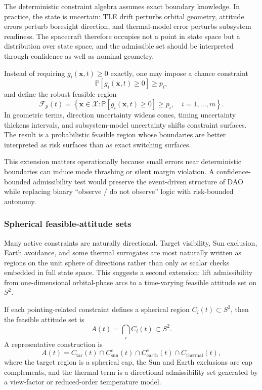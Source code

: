 \documentclass[preprint,12pt]{elsarticle}
\theoremstyle{definition}
\theoremstyle{remark}
\begin{document}
The deterministic constraint algebra assumes exact boundary knowledge.
In practice, the state is uncertain: TLE drift perturbs orbital geometry, attitude errors perturb boresight direction, and thermal-model error perturbs subsystem readiness.
The spacecraft therefore occupies not a point in state space but a distribution over state space, and the admissible set should be interpreted through confidence as well as nominal geometry.

Instead of requiring $g_i(\mathbf{x},t)\ge 0$ exactly, one may impose a chance constraint
\begin{equation}
\mathbb{P}\!\left[g_i(\mathbf{x},t)\ge 0\right]\ge p_i,
\label{eq:chance_constraint}
\end{equation}
and define the robust feasible region
\begin{equation}
\mathcal{F}_p(t)=
\left\{
\mathbf{x}\in\mathcal{X} :
\mathbb{P}\!\left[g_i(\mathbf{x},t)\ge 0\right]\ge p_i,\quad i=1,\ldots,m
\right\}.
\label{eq:feasible_region_prob}
\end{equation}
In geometric terms, direction uncertainty widens cones, timing uncertainty thickens intervals, and subsystem-model uncertainty shifts constraint surfaces.
The result is a probabilistic feasible region whose boundaries are better interpreted as risk surfaces than as exact switching surfaces.

This extension matters operationally because small errors near deterministic boundaries can induce mode thrashing or silent margin violation.
A confidence-bounded admissibility test would preserve the event-driven structure of DAO while replacing binary ``observe / do not observe'' logic with risk-bounded autonomy.

\subsubsection{Spherical feasible-attitude sets}

Many active constraints are naturally directional.
Target visibility, Sun exclusion, Earth avoidance, and some thermal surrogates are most naturally written as regions on the unit sphere of directions rather than only as scalar checks embedded in full state space.
This suggests a second extension: lift admissibility from one-dimensional orbital-phase arcs to a time-varying feasible attitude set on $S^2$.

If each pointing-related constraint defines a spherical region $C_i(t)\subset S^2$, then the feasible attitude set is
\begin{equation}
A(t)=\bigcap_i C_i(t)\subset S^2.
\label{eq:attitude_set}
\end{equation}
A representative construction is
\begin{equation}
A(t)=C_{\mathrm{tar}}(t)\cap C_{\mathrm{sun}}^{c}(t)\cap C_{\mathrm{earth}}^{c}(t)\cap C_{\mathrm{thermal}}(t),
\label{eq:attitude_set_example}
\end{equation}
where the target region is a spherical cap, the Sun and Earth exclusions are cap complements, and the thermal term is a directional admissibility set generated by a view-factor or reduced-order temperature model.
\end{document}
